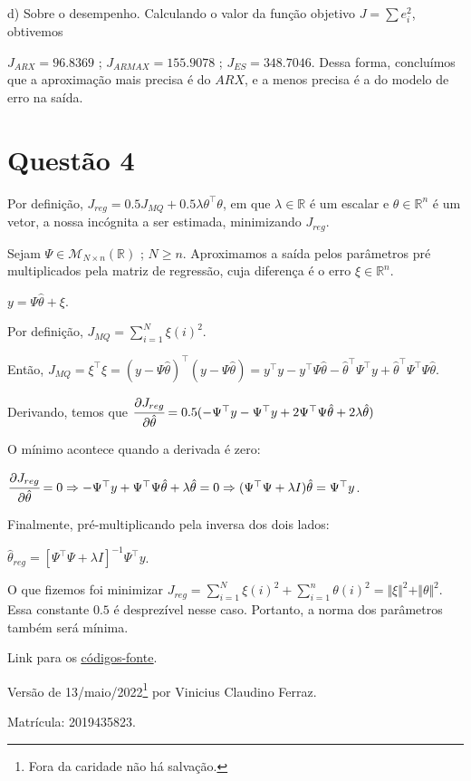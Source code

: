 \documentclass{rbfin}
\begin{document}
d) Sobre o desempenho. Calculando o valor da função objetivo $J = \sum e_i^2$, obtivemos 

$J_{ARX} = 96.8369$ ; $J_{ARMAX} = 155.9078$ ; $J_{ES} = 348.7046$. Dessa forma, concluímos que a aproximação mais precisa é do $ARX$, e a menos precisa é a do modelo de erro na saída.

\section*{Questão 4}

Por definição, $J_{reg} = 0.5 J_{MQ} + 0.5 \lambda \theta^\top \theta$, em que $\lambda \in \mathbb{R}$ é um escalar e $\theta \in \mathbb{R}^n$ é um vetor, a nossa incógnita a ser estimada, minimizando $J_{reg}$.

Sejam $\Psi \in \mathcal{M}_{N \times n}(\mathbb{R})$ ; $N \ge n$. Aproximamos a saída pelos parâmetros pré multiplicados pela matriz de regressão, cuja diferença é o erro $\xi \in \mathbb{R}^n$. 

$y = \Psi \hat\theta + \xi$.

Por definição, $J_{MQ} = \sum_{i = 1}^N \xi(i)^2$.

Então, $J_{MQ} = \xi^\top \xi = (y - \Psi \hat\theta)^\top (y - \Psi \hat\theta) = y^\top y - y^\top \Psi \hat\theta - \hat\theta^\top \Psi^\top y +  \hat\theta^\top \Psi^\top \Psi \hat\theta$.

Derivando, temos que $\cfrac{\partial J_{reg}}{\partial \hat \theta} = 0.5( - \Psi^\top y - \Psi^\top y + 2 \Psi^\top \Psi \hat \theta + 2 \lambda \hat \theta)$

O mínimo acontece quando a derivada é zero:

$\cfrac{\partial J_{reg}}{\partial \hat \theta} = 0\Rightarrow - \Psi^\top y + \Psi^\top \Psi \hat \theta + \lambda \hat \theta = 0 \Rightarrow (\Psi^\top \Psi + \lambda I) \hat \theta = \Psi^\top y$.

Finalmente, pré-multiplicando pela inversa dos dois lados:

$\hat \theta_{reg} = [\Psi^\top \Psi + \lambda I]^{-1} \Psi^\top y$.

O que fizemos foi minimizar $J_{reg} = \sum_{i = 1}^N \xi(i)^2 + \sum_{i = 1}^n \theta(i)^2 = \Vert \xi \Vert^2 + \Vert \theta \Vert^2$. Essa constante $0.5$ é desprezível nesse caso. Portanto, a norma dos parâmetros também será mínima.

\vspace{6mm}

Link para os \href{https://drive.google.com/file/d/1iwa1n0PrfYBjP0JjEgHDD2WnVX3Xsz3W/view?usp=sharing}{\color{blue}\underline{códigos-fonte}}.

Versão de 13/maio/2022\footnote{Fora da caridade não há salvação.} por Vinicius Claudino Ferraz. 

Matrícula: 2019435823.
\end{document}
